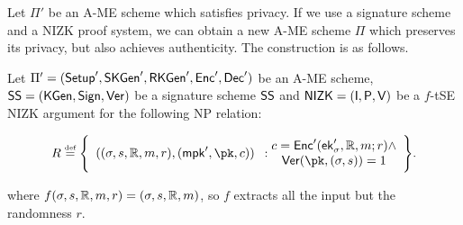 Let $\Pi'$ be an A-ME scheme which satisfies privacy. If we use a signature scheme and a NIZK proof system, we can obtain a new A-ME scheme $\Pi$ which preserves its privacy, but also achieves authenticity. The construction is as follows.

\begin{construction}\label{constr:ame_nizk}
    Let $\Pi'=(\mathsf{Setup}',\mathsf{SKGen}',\mathsf{RKGen}', \mathsf{Enc}',\mathsf{Dec}')$ be an A-ME scheme, $\mathsf{SS} =(\mathsf{KGen},\mathsf{Sign},\mathsf{Ver})$ be a signature scheme $\mathsf{SS}$ and $\mathsf{NIZK}=(\mathsf{I}, \mathsf{P}, \mathsf{V})$ be a $f$-tSE NIZK argument for the following NP relation:

    \[
        R \eqdef \Biggl\{ \begin{array}{c}((\sattr, \signature, \raccess, \msg, r),(\mpk', \pk, \cipher))\end{array}:\begin{array}{@{}c}
            \cipher = \enc'(\ek'_\sattr, \raccess, \msg; r) \land \\
            \ver(\pk, (\sattr, \signature)) = 1
        \end{array} \Biggr\}.
    \]

    where $f(\sigma, s, \mathbb{R}, m, r) = (\sigma, s, \mathbb{R}, m)$, so $f$ extracts all the input but the randomness $r$.


\end{construction}
